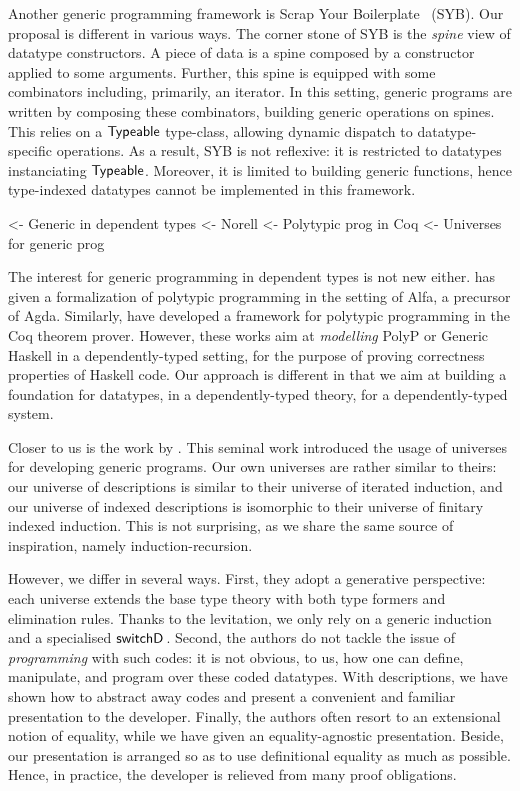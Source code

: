 Another generic programming framework is Scrap Your
Boilerplate~\cite{spj:syb} (SYB). Our proposal is different in various
ways. The corner stone of SYB is the \emph{spine} view of datatype
constructors. A piece of data is a spine composed by a constructor
applied to some arguments. Further, this spine is equipped with some
combinators including, primarily, an iterator. In this setting,
generic programs are written by composing these combinators, building
generic operations on spines. This relies on a $\textsf{Typeable}$
type-class, allowing dynamic dispatch to datatype-specific
operations. As a result, SYB is not reflexive: it is restricted to
datatypes instanciating $\textsf{Typeable}$. Moreover, it is limited to
building generic functions, hence type-indexed datatypes cannot be
implemented in this framework.


\begin{wstructure}
    <- Generic in dependent types
        <- Norell \cite{norell:msc-thesis}
        <- Polytypic prog in Coq \cite{verbruggen:polytype-coq}
        <- Universes for generic prog \cite{benke:universe-generic-prog}
\end{wstructure}

The interest for generic programming in dependent types is not new
either. \citet{norell:msc-thesis} has given a formalization of
polytypic programming in the setting of Alfa, a precursor of
Agda. Similarly, \citet{verbruggen:polytype-prog-coq,
  verbruggen:polytype-coq} have developed a framework for polytypic
programming in the Coq theorem prover. However, these works aim at
\emph{modelling} PolyP or Generic Haskell in a dependently-typed
setting, for the purpose of proving correctness properties of Haskell
code. Our approach is different in that we aim at building a
foundation for datatypes, in a dependently-typed theory, for a
dependently-typed system.

Closer to us is the work by \citet{benke:universe-generic-prog}. This
seminal work introduced the usage of universes for developing generic
programs. Our own universes are rather similar to theirs: our universe
of descriptions is similar to their universe of iterated induction,
and our universe of indexed descriptions is isomorphic to their
universe of finitary indexed induction. This is not surprising, as we
share the same source of inspiration, namely induction-recursion.

However, we differ in several ways. First, they adopt a generative
perspective: each universe extends the base type theory with both type
formers and elimination rules. Thanks to the levitation, we only rely
on a generic induction and a specialised
$\switchD{\!}{\!}{\!}$. Second, the authors do not tackle the issue of
\emph{programming} with such codes: it is not obvious, to us, how one
can define, manipulate, and program over these coded datatypes. With
descriptions, we have shown how to abstract away codes and present a
convenient and familiar presentation to the developer. Finally, the
authors often resort to an extensional notion of equality, while we
have given an equality-agnostic presentation. Beside, our presentation
is arranged so as to use definitional equality as much as
possible. Hence, in practice, the developer is relieved from many
proof obligations.
